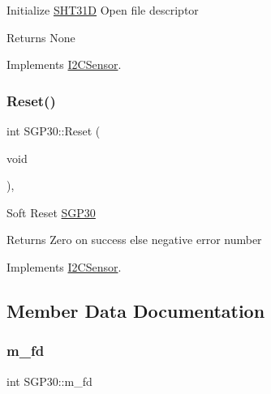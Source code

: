 Initialize \hyperlink{classSHT31D}{S\+H\+T31D} Open file descriptor

\begin{DoxyReturn}{Returns}
None 
\end{DoxyReturn}


Implements \hyperlink{classI2CSensor_a0fb4755ddff3fe2cf5a9651d9d1fe5cd}{I2\+C\+Sensor}.

\mbox{\label{classSGP30_a4934ef3a64eb0782a6d956c6526e4186}} 
\subsubsection{\texorpdfstring{Reset()}{Reset()}}
{\footnotesize\ttfamily int S\+G\+P30\+::\+Reset (\begin{DoxyParamCaption}\item[{void}]{ }\end{DoxyParamCaption})\hspace{0.3cm}{\ttfamily [override]}, {\ttfamily [virtual]}}

Soft Reset \hyperlink{classSGP30}{S\+G\+P30}

\begin{DoxyReturn}{Returns}
Zero on success else negative error number 
\end{DoxyReturn}


Implements \hyperlink{classI2CSensor_a0622266d335944782d2bfa6352f01095}{I2\+C\+Sensor}.



\subsection{Member Data Documentation}
\mbox{\label{classSGP30_a751dee30db306b3f2ff17540adb7dfc9}} 
\subsubsection{\texorpdfstring{m\+\_\+fd}{m\_fd}}
{\footnotesize\ttfamily int S\+G\+P30\+::m\+\_\+fd\hspace{0.3cm}{\ttfamily [private]}}

\mbox{\label{classSGP30_a11b0db4fcffa5e8da8982a48ae0b1456}} 
